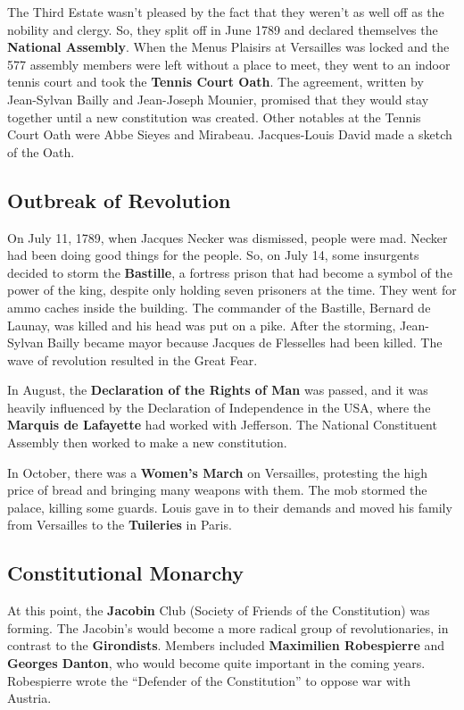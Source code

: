 The Third Estate wasn't pleased by the fact that they weren't as well off as the nobility and clergy.
So, they split off in June 1789 and declared themselves the \textbf{National Assembly}.
When the Menus Plaisirs at Versailles was locked and the 577 assembly members were left without a place to meet,
they went to an indoor tennis court and took the \textbf{Tennis Court Oath}.
The agreement, written by Jean-Sylvan Bailly and Jean-Joseph Mounier,
promised that they would stay together until a new constitution was created.
Other notables at the Tennis Court Oath were Abbe Sieyes and Mirabeau.
Jacques-Louis David made a sketch of the Oath.

\subsection*{Outbreak of Revolution}

On July 11, 1789, when Jacques Necker was dismissed, people were mad.
Necker had been doing good things for the people.
So, on July 14, some insurgents decided to storm the \textbf{Bastille},
a fortress prison that had become a symbol of the power of the king,
despite only holding seven prisoners at the time.
They went for ammo caches inside the building.
The commander of the Bastille, Bernard de Launay, was killed and his head was put on a pike.
After the storming, Jean-Sylvan Bailly became mayor because Jacques de Flesselles had been killed.
The wave of revolution resulted in the Great Fear.

In August, the \textbf{Declaration of the Rights of Man} was passed,
and it was heavily influenced by the Declaration of Independence in the USA,
where the \textbf{Marquis de Lafayette} had worked with Jefferson.
The National Constituent Assembly then worked to make a new constitution.

In October, there was a \textbf{Women's March} on Versailles,
protesting the high price of bread and bringing many weapons with them.
The mob stormed the palace, killing some guards.
Louis gave in to their demands and moved his family from Versailles to the \textbf{Tuileries} in Paris.

\subsection*{Constitutional Monarchy}

At this point, the \textbf{Jacobin} Club (Society of Friends of the Constitution) was forming.
The Jacobin's would become a more radical group of revolutionaries, in contrast to the \textbf{Girondists}.
Members included \textbf{Maximilien Robespierre} and \textbf{Georges Danton},
who would become quite important in the coming years.
Robespierre wrote the ``Defender of the Constitution'' to oppose war with Austria.

